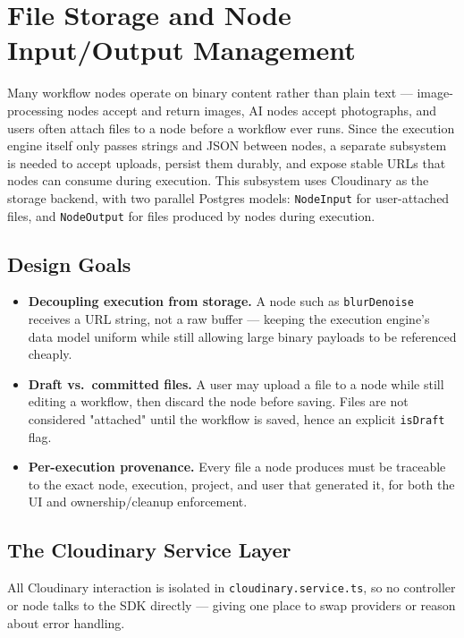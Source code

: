 \section{File Storage and Node Input/Output Management}
\label{sec:file-storage}

Many workflow nodes operate on binary content rather than plain text — image-processing nodes accept and return images, AI nodes accept photographs, and users often attach files to a node before a workflow ever runs. Since the execution engine itself only passes strings and JSON between nodes, a separate subsystem is needed to accept uploads, persist them durably, and expose stable URLs that nodes can consume during execution. This subsystem uses Cloudinary as the storage backend, with two parallel Postgres models: \texttt{NodeInput} for user-attached files, and \texttt{NodeOutput} for files produced by nodes during execution.

\subsection{Design Goals}

\begin{itemize}
  \item \textbf{Decoupling execution from storage.} A node such as \texttt{blurDenoise} receives a URL string, not a raw buffer — keeping the execution engine's data model uniform while still allowing large binary payloads to be referenced cheaply.
  \item \textbf{Draft vs.\ committed files.} A user may upload a file to a node while still editing a workflow, then discard the node before saving. Files are not considered "attached" until the workflow is saved, hence an explicit \texttt{isDraft} flag.
  \item \textbf{Per-execution provenance.} Every file a node produces must be traceable to the exact node, execution, project, and user that generated it, for both the UI and ownership/cleanup enforcement.
\end{itemize}

\subsection{The Cloudinary Service Layer}

All Cloudinary interaction is isolated in \texttt{cloudinary.service.ts}, so no controller or node talks to the SDK directly — giving one place to swap providers or reason about error handling.


